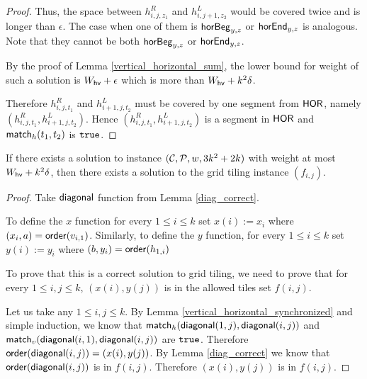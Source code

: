 \begin{proof}
Thus, the space between $h^R_{i,j,z_1}$ and $h^L_{i,j+1,z_2}$
would be covered twice and is longer than $\epsilon$.
The case when one of them is $\mathsf{horBeg}_{y,z}$ or $\mathsf{horEnd}_{y,z}$ is analogous.
Note that they cannot be both $\mathsf{horBeg}_{y,z}$ or $\mathsf{horEnd}_{y,z}$.

By the proof of Lemma \ref{vertical_horizontal_sum},
the lower bound for weight of such a solution is $W_{\mathsf{hv}} + \epsilon$
which is more than $W_{\mathsf{hv}}+k^2\delta$.

Therefore $h^R_{i,j,t_1}$ and $h^L_{i+1,j,t_2}$ must be covered
by one segment from $\mathsf{HOR}$, namely $(h^R_{i,j,t_1}, h^L_{i+1,j,t_2})$.
Hence $(h^R_{i,j,t_1}, h^L_{i+1,j,t_2})$ is a segment in $\mathsf{HOR}$
and $\mathsf{match}_h(t_1,t_2)$ is $\texttt{true}$.
\end{proof}


\begin{lemma}
\label{grid_tiling_exists}
	If there exists a solution to instance $(\mathcal{C}, \mathcal{P}, w, 3k^2+2k)$
	with weight at most $W_{\mathsf{hv}}+k^2\delta$,
	then there exists a solution to the grid tiling instance $(f_{i,j})$.
\end{lemma}

\begin{proof}
Take $\mathsf{diagonal}$ function from Lemma \ref{diag_correct}.

To define the $x$ function 
for every $1 \le i \le k$ set $x(i) := x_i$
where $(x_i, a) = \mathsf{order}(v_{i,1})$.
Similarly, to define the $y$ function,
for every $1 \le i \le k$ set $y(i) := y_i$
where $(b, y_i) = \mathsf{order}(h_{1,i})$

To prove that this is a correct solution to grid tiling,
we need to prove that 
for every $1 \le i,j \le k$, $(x(i), y(j))$ is in
the allowed tiles set $f(i,j)$.

Let us take any $1 \le i,j \le k$.
By Lemma \ref{vertical_horizontal_synchronized}
and simple induction,
we know that $\mathsf{match}_h(\mathsf{diagonal}(1, j),\mathsf{diagonal}(i, j))$ and
$\mathsf{match}_v(\mathsf{diagonal}(i, 1),\mathsf{diagonal}(i, j))$ are $\texttt{true}$.
Therefore $\mathsf{order}(\mathsf{diagonal}(i,j)) = (x(i), y(j))$.
By Lemma \ref{diag_correct} we know that 
$\mathsf{order}(\mathsf{diagonal}(i,j))$ is in $f(i,j)$.
Therefore 
$(x(i), y(j))$
is in $f(i,j)$.
\end{proof}

